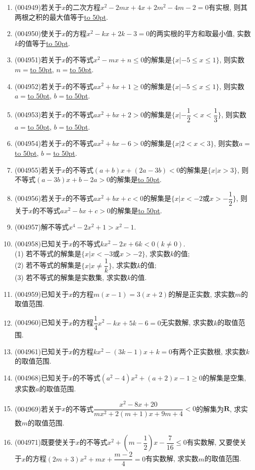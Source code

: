 \documentclass[10pt,a4paper]{article}
\newcommand{\blank}[1]{\underline{\hbox to #1pt{}}}
\begin{document}
\begin{enumerate}[1.]
\item {\tiny (004949)}若关于$x$的二次方程$x^2-2mx+4x+2m^2-4m-2=0$有实根, 则其两根之积的最大值等于\blank{50}.
\item {\tiny (004950)}使关于$x$的方程$x^2-kx+2k-3=0$的两实根的平方和取最小值, 实数$k$的值等于\blank{50}.
\item {\tiny (004951)}若关于$x$的不等式$x^2-mx+n\le 0$的解集是$\{x|-5\le x\le 1\}$, 则实数$m=$\blank{50}, $n=$\blank{50}.
\item {\tiny (004952)}若关于$x$的不等式$ax^2+bx+1\ge 0$的解集是$\{x|-5\le x\le 1\}$, 则实数$a=$\blank{50}, $b=$\blank{50}.
\item {\tiny (004953)}若关于$x$的不等式$ax^2+bx+2>0$的解集是$\{x|-\dfrac 12<x<\dfrac 13\}$, 则实数$a=$\blank{50}, $b=$\blank{50}.
\item {\tiny (004954)}若关于$x$的不等式$ax^2+bx-6>0$的解集是$\{x|2<x<3\}$, 则实数$a=$\blank{50}, $b=$\blank{50}.
\item {\tiny (004955)}若关于$x$的不等式$(a+b)x+(2a-3b)<0$的解集是$\{x|x>3\}$, 则不等式$(a-3b)x+b-2a>0$的解集是\blank{50}.
\item {\tiny (004956)}若关于$x$的不等式$ax^2+bx+c<0$的解集是$\{x|x<-2\text{或}x>-\dfrac 12\}$, 则关于$x$的不等式$ax^2-bx+c>0$的解集是\blank{50}.
\item {\tiny (004957)}解不等式$x^4-2x^2+1>x^2-1$.
\item {\tiny (004958)}已知关于$x$的不等式$kx^2-2x+6k<0(k\ne 0)$.\\
(1) 若不等式的解集是$\{x|x<-3\text{或}x>-2\}$, 求实数$k$的值;\\
(2) 若不等式的解集是$\{x|x\ne \dfrac 1k\}$, 求实数$k$的值;\\
(3) 若不等式的解集是实数集, 求实数$k$的值.
\item {\tiny (004959)}已知关于$x$的方程$m(x-1)=3(x+2)$的解是正实数, 求实数$m$的取值范围.
\item {\tiny (004960)}已知关于$x$的方程$\dfrac 14x^2-kx+5k-6=0$无实数解, 求实数$k$的取值范围.
\item {\tiny (004961)}已知关于$x$的方程$kx^2-(3k-1)x+k=0$有两个正实数根, 求实数$k$的取值范围.
\item {\tiny (004968)}已知关于$x$的不等式$(a^2-4)x^2+(a+2)x-1\ge 0$的解集是空集, 求实数$a$的取值范围.
\item {\tiny (004969)}若关于$x$的不等式$\dfrac{x^2-8x+20}{mx^2+2(m+1)x+9m+4}<0$的解集为$\mathbf{R}$, 求实数$m$的取值范围.
\item {\tiny (004971)}既要使关于$x$的不等式$x^2+(m-\dfrac 12)x-\dfrac 7{16}\le 0$有实数解, 又要使关于$x$的方程$(2m+3)x^2+mx+\dfrac{m-2}4=0$有实数解, 求实数$m$的取值范围.

\end{enumerate}
\end{document}
